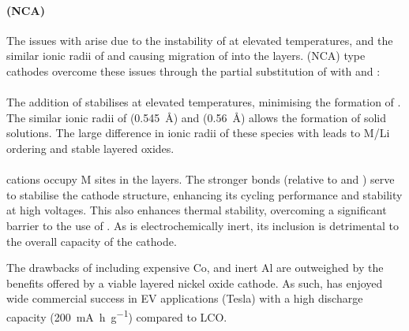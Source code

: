 \paragraph{ (NCA)}
The issues with  arise due to the instability of  at elevated temperatures, and the similar ionic radii of  and  causing migration of  into the  layers.\cite{Das2017}
 (NCA) type cathodes overcome these issues through the partial substitution of  with  and :


\paragraph{}
The addition of  stabilises  at elevated temperatures, minimising the formation of .
The similar ionic radii of  (\SI{0.545}{\angstrom}) and  (\SI{0.56}{\angstrom}) allows the formation of  solid solutions.\cite{Rozier2015}
The large difference in ionic radii of these species with  leads to M/Li ordering and stable layered oxides.

\paragraph{}  cations occupy M sites in the  layers.
The stronger  bonds (relative to  and ) serve to stabilise the cathode structure, enhancing its cycling performance and stability at high voltages.
This also enhances thermal stability, overcoming a significant barrier to the use of .
As  is electrochemically inert, its inclusion is detrimental to the overall capacity of the cathode.

The drawbacks of including expensive Co, and inert Al are outweighed by the benefits offered by a viable layered nickel oxide cathode.
As such,  has enjoyed wide commercial success in EV applications (Tesla) with a high discharge capacity (\SI{200}{\milli\ampere\hour\per\gram}) compared to LCO.
\cite{Nitta2015}



\newpage

